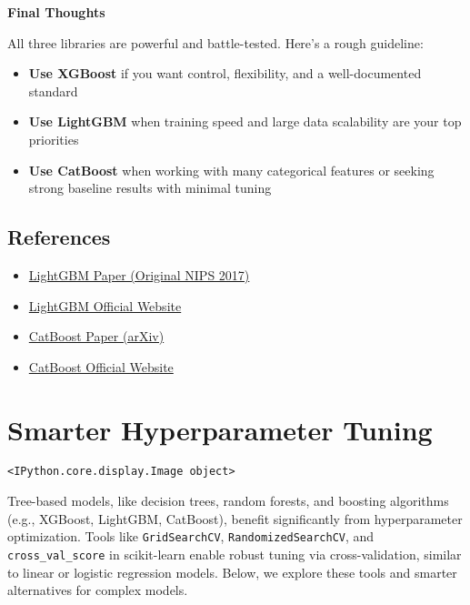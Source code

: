 \documentclass[
  letterpaper,
  DIV=11,
  numbers=noendperiod]{scrreprt}
\providecommand{\tightlist}{%
  \setlength{\itemsep}{0pt}\setlength{\parskip}{0pt}}\usepackage{longtable,booktabs,array}
\begin{document}
\textbf{Final Thoughts}

All three libraries are powerful and battle-tested. Here's a rough
guideline:

\begin{itemize}
\tightlist
\item
  \textbf{Use XGBoost} if you want control, flexibility, and a
  well-documented standard
\item
  \textbf{Use LightGBM} when training speed and large data scalability
  are your top priorities
\item
  \textbf{Use CatBoost} when working with many categorical features or
  seeking strong baseline results with minimal tuning
\end{itemize}

\section{References}\label{references}

\begin{itemize}
\tightlist
\item
  \href{https://papers.nips.cc/paper_files/paper/2017/file/6449f44a102fde848669bdd9eb6b76fa-Paper.pdf}{LightGBM
  Paper (Original NIPS 2017)}
\item
  \href{https://lightgbm.readthedocs.io/}{LightGBM Official Website}
\item
  \href{https://arxiv.org/abs/1810.11363}{CatBoost Paper (arXiv)}
\item
  \href{https://catboost.ai/}{CatBoost Official Website}
\end{itemize}

\chapter{Smarter Hyperparameter
Tuning}\label{smarter-hyperparameter-tuning}

\begin{verbatim}
<IPython.core.display.Image object>
\end{verbatim}

Tree-based models, like decision trees, random forests, and boosting
algorithms (e.g., XGBoost, LightGBM, CatBoost), benefit significantly
from hyperparameter optimization. Tools like \texttt{GridSearchCV},
\texttt{RandomizedSearchCV}, and \texttt{cross\_val\_score} in
scikit-learn enable robust tuning via cross-validation, similar to
linear or logistic regression models. Below, we explore these tools and
smarter alternatives for complex models.
\end{document}
